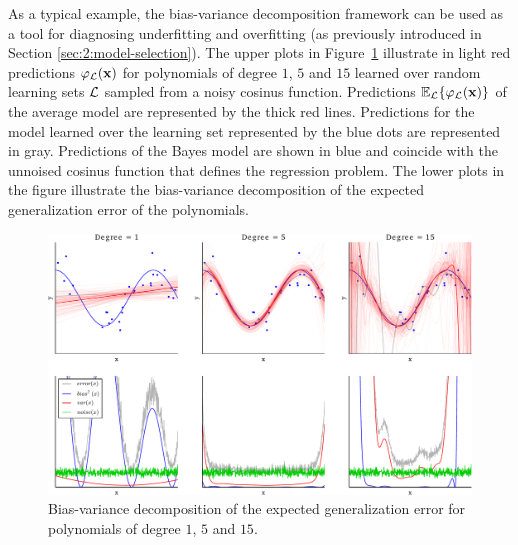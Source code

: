 As a typical example, the bias-variance decomposition framework can be used as
a tool for diagnosing underfitting and overfitting (as previously introduced in
Section \ref{sec:2:model-selection}). The upper plots in
Figure~\ref{fig:overfitting} illustrate in light red predictions $\varphi_{\cal
L}(\mathbf{x})$ for polynomials of degree $1$, $5$ and $15$ learned over random
learning sets ${\cal L}$ sampled from a noisy cosinus function. Predictions
$\mathbb{E}_{\cal L} \{ \varphi_{\cal L}(\mathbf{x}) \}$ of the average model
are represented by the thick red lines. Predictions for the model learned over
the learning set represented by the blue dots are represented in gray.
Predictions of the Bayes model are shown in blue and coincide with the unnoised
cosinus function that defines the regression problem. The lower plots in the
figure illustrate the bias-variance decomposition of the expected
generalization error of the polynomials.

\begin{figure}
    \hspace{-0.75cm}\includegraphics[width=1.1\textwidth]{figures/ch4_overfitting.pdf}
    \caption{Bias-variance decomposition of the expected generalization error for polynomials of degree $1$, $5$ and $15$.}
    \label{fig:overfitting}
\end{figure}

